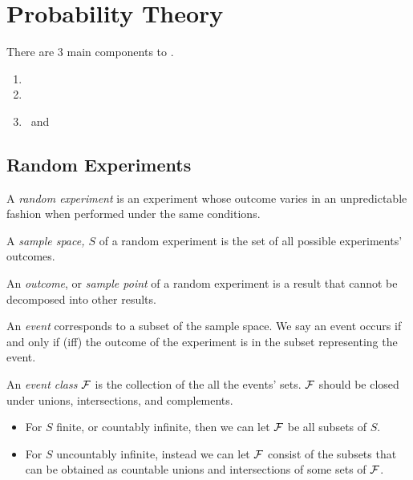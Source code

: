 \section{Probability Theory} \label{sec:Probability Theory}
There are 3 main components to .
\begin{enumerate}
	\item {}
	\item {}
	\item {}~and~
\end{enumerate}

	\subsection{Random Experiments} \label{subsec:Random Experiments}
	\begin{definition} \label{def:Random Experiment}
		A \emph{random experiment} is an experiment whose outcome varies in an unpredictable fashion when performed under the same conditions.
	\end{definition}
	\begin{definition} \label{def:Sample Space}
		A \emph{sample space, $S$} of a random experiment is the set of all possible experiments' outcomes.
	\end{definition}
	\begin{definition} \label{def:Outcome}
		An \emph{outcome}, or \emph{sample point} of a random experiment is a result that cannot be decomposed into other results.
	\end{definition}
	\begin{definition}[Event] \label{def:Event}
		An \emph{event} corresponds to a subset of the sample space. We say an event occurs if and only if (iff) the outcome of the experiment is in the subset representing the event.
	\end{definition}
	\begin{definition} \label{def:Event Classes}
		An \emph{event class} $\operatorname{\mathcal{F}}$ is the collection of the all the events' sets. $\operatorname{\mathcal{F}}$ should be closed under unions, intersections, and complements.
		\begin{itemize}[noitemsep, nolistsep]
			\item For $S$ finite, or countably infinite, then we can let $\operatorname{\mathcal{F}}$ be all subsets of $S$.
			\item For $S$ uncountably infinite, instead we can let $\operatorname{\mathcal{F}}$ consist of the subsets that can be obtained as countable unions and intersections of some sets of $\operatorname{\mathcal{F}}$.
		\end{itemize}
	\end{definition}
